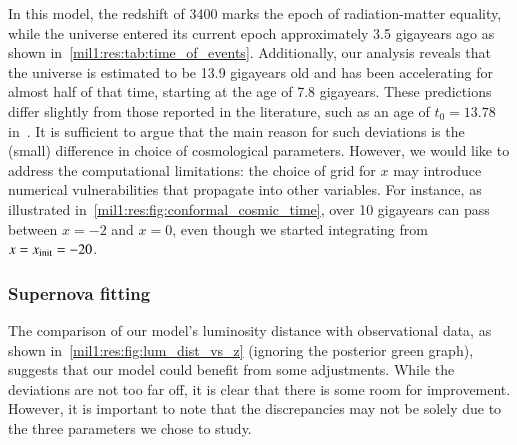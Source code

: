 
In this model, the redshift of 3400 marks the epoch of radiation-matter equality, while the universe entered its current epoch approximately 3.5 gigayears ago as shown in~\cref{mil1:res:tab:time_of_events}. Additionally, our analysis reveals that the universe is estimated to be 13.9 gigayears old and has been accelerating for almost half of that time, starting at the age of 7.8 gigayears. These predictions differ slightly from those reported in the literature, such as an age of $t_0=13.78$ in~\citet{DodelsonBook}. It is sufficient to argue that the main reason for such deviations is the (small) difference in choice of cosmological parameters. However, we would like to address the computational limitations: the choice of grid for $x$ may introduce numerical vulnerabilities that propagate into other variables. For instance, as illustrated in~\cref{mil1:res:fig:conformal_cosmic_time}, over 10 gigayears can pass between $x=-2$ and $x=0$, even though we started integrating from $x=x_\mathrm{init}=-20$.  












\subsubsection{Supernova fitting}
    The comparison of our model's luminosity distance with observational data, as shown in~\cref{mil1:res:fig:lum_dist_vs_z} (ignoring the posterior green graph), suggests that our model could benefit from some adjustments. While the deviations are not too far off, it is clear that there is some room for improvement. However, it is important to note that the discrepancies may not be solely due to the three parameters we chose to study. 


